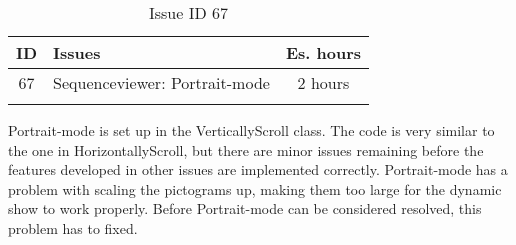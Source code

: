 \begin{longtable} { | c | p{12cm} | c | } 
\hline
	ID 	&	Issues	&		 Es. hours \\\hline
	 67	&	Sequenceviewer: Portrait-mode	&	2 hours \\\hline
\caption{Issue ID 67}
\label{tab:spr4_SVportrait}
\end{longtable}

Portrait-mode is set up in the VerticallyScroll class. The code is very similar to the one in HorizontallyScroll, but there are minor issues remaining before the features developed in other issues are implemented correctly. Portrait-mode has a problem with scaling the pictograms up, making them too large for the dynamic show to work properly. Before Portrait-mode can be considered resolved, this problem has to fixed.
